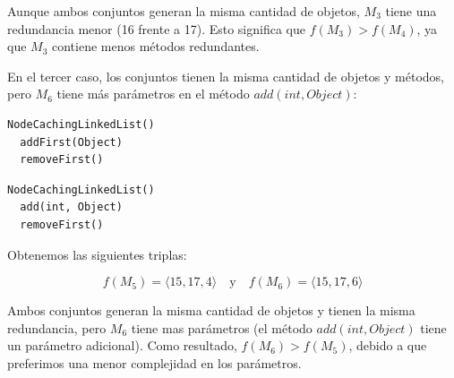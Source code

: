 Aunque ambos conjuntos generan la misma cantidad de objetos, \( M_3 \) tiene una redundancia menor (16 frente a 17). Esto significa que \( f(M_3) > f(M_4) \), ya que \( M_3 \) contiene menos métodos redundantes.

En el tercer caso, los conjuntos tienen la misma cantidad de objetos y métodos, pero \( M_6 \) tiene más parámetros en el método \( add(int, Object) \):
\vspace{10pt} 

\begin{lstlisting}[numbers=none,label=fig:NCLbuilders5, caption=Conjunto de métodos \( M_5 \)]
  NodeCachingLinkedList()
  addFirst(Object)
  removeFirst()
\end{lstlisting}

\vspace{10pt} 

\begin{lstlisting}[numbers=none,label=fig:NCLbuilders6, caption=Conjunto de métodos \( M_6 \)]
  NodeCachingLinkedList()
  add(int, Object)
  removeFirst()
\end{lstlisting}

\vspace{10pt} 

Obtenemos las siguientes triplas:

\[
f(M_5) = \langle 15, 17, 4 \rangle \quad \text{y} \quad f(M_6) = \langle 15, 17, 6 \rangle
\]

Ambos conjuntos generan la misma cantidad de objetos y tienen la misma redundancia, pero \( M_6 \) tiene mas parámetros (el método \( add(int, Object) \) tiene un parámetro adicional). Como resultado, \( f(M_6) > f(M_5) \), debido a que preferimos una menor complejidad en los parámetros.






